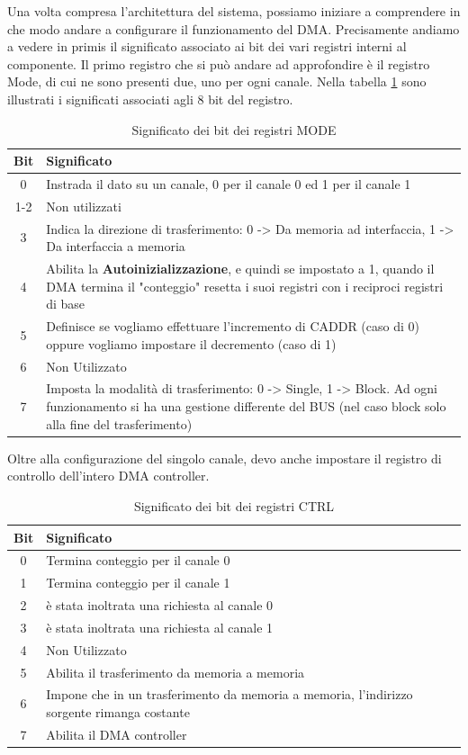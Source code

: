 Una volta compresa l'architettura del sistema, possiamo iniziare a comprendere in che modo andare a configurare il funzionamento del  DMA. Precisamente andiamo a vedere in primis il significato associato ai bit dei vari registri interni al componente.
Il primo registro che si può andare ad approfondire è il registro Mode, di cui ne sono presenti due, uno per ogni canale. Nella tabella \ref{tab:MODE-8237} sono illustrati i significati associati agli 8 bit del registro.

\begin{table}[h]
    \centering
    \begin{tabular}{|c|p{11cm}|}
    \hline
    \textbf{Bit} & \textbf{Significato} \\
    \hline
    0 & Instrada il dato su un canale, 0 per il canale 0 ed 1 per il canale 1 \\
    1-2 & Non utilizzati \\
    3 & Indica la direzione di trasferimento: 0 -> Da memoria ad interfaccia, 1 -> Da interfaccia a memoria \\
    4 & Abilita la \textbf{Autoinizializzazione}, e quindi se impostato a 1, quando il DMA termina il "conteggio" resetta i suoi registri con i reciproci registri di base \\
    5 & Definisce se vogliamo effettuare l'incremento di CADDR (caso di 0) oppure vogliamo impostare il decremento (caso di 1) \\
    6 & Non Utilizzato \\
    7 & Imposta la modalità di trasferimento: 0 -> Single, 1 -> Block. Ad ogni funzionamento si ha una gestione differente del BUS (nel caso block solo alla fine del trasferimento) \\
    \hline
    \end{tabular}
    \caption{Significato dei bit dei registri MODE}\label{tab:MODE-8237}
\end{table}

Oltre alla configurazione del singolo canale, devo anche impostare il registro di controllo dell'intero DMA controller.
\begin{table}[h]
    \centering
    \begin{tabular}{|c|p{11cm}|}
    \hline
    \textbf{Bit} & \textbf{Significato} \\
    \hline
    0 & Termina conteggio per il canale 0 \\
    1 & Termina conteggio per il canale 1 \\
    2 & è stata inoltrata una richiesta al canale 0 \\
    3 & è stata inoltrata una richiesta al canale 1 \\
    4 & Non Utilizzato \\
    5 & Abilita il trasferimento da memoria a memoria \\
    6 & Impone che in un trasferimento da memoria a memoria, l'indirizzo sorgente rimanga costante \\
    7 & Abilita il DMA controller \\
    \hline
    \end{tabular}
    \caption{Significato dei bit dei registri CTRL}\label{tab:CTRL-8237}
\end{table}

